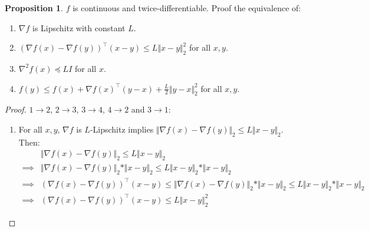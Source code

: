 \documentclass[12pt]{article}
\newcommand{\mmo}[1]{\Vert #1 \Vert}
\theoremstyle{definition}
\newtheorem{prop}{Proposition}[section]
\begin{document}
	\begin{prop}
		$f$ is continuous and twice-differentiable. Proof the equivalence of:
		\begin{enumerate}
			\item $\nabla f$ is Lipschitz with constant $L$.
			\item $(\nabla f(x) - \nabla f(y))^\top(x - y) \leq L \Vert x - y \Vert_2^2$ for all $x, y$.
			\item $\nabla^2 f(x) \preceq LI$ for all $x$.
			\item $f(y) \leq f(x) + \nabla f(x)^\top (y - x) + \frac{L}{2}\Vert y - x \Vert^2_2$ for all $x, y$.
		\end{enumerate}
	\end{prop}
	
	\begin{proof}
		$1 \to 2$, $2 \to 3$, $3 \to 4$, $4 \to 2$ and $3 \to 1$:
		\begin{enumerate}
			\item For all $x, y$, $\nabla f$ is $L$-Lipschitz implies $\mmo{\nabla f(x) - \nabla f(y)}_2 \leq L\mmo{x - y}_2$. Then:
			\begin{align*}
				&\mmo{\nabla f(x) - \nabla f(y)}_2 \leq L\mmo{x - y}_2 \\
				\implies &\mmo{\nabla f(x) - \nabla f(y)}_2 * \mmo{x - y}_2\leq L\mmo{x - y}_2 * \mmo{x - y}_2 \\
				\implies &(\nabla f(x) - \nabla f(y))^\top(x - y) \leq \mmo{\nabla f(x) - \nabla f(y)}_2 * \mmo{x - y}_2\leq L\mmo{x - y}_2 * \mmo{x - y}_2 \\
				\implies &(\nabla f(x) - \nabla f(y))^\top(x - y) \leq L \mmo{x - y}_2^2
			\end{align*}
		\end{enumerate}
	\end{proof}
	
\end{document}
